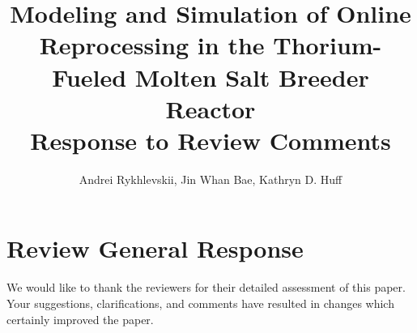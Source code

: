 \documentclass[answers,11pt]{exam}
\begin{document}


%

\title{Modeling and Simulation of Online Reprocessing in the Thorium-Fueled 
        Molten Salt Breeder Reactor\\
\large Response to Review Comments}
\author{Andrei Rykhlevskii, Jin Whan Bae, Kathryn D. Huff}



%
\maketitle
\section*{Review General Response}
We would like to thank the reviewers for their detailed assessment of
this paper. Your suggestions, clarifications, and comments have resulted in 
changes which certainly improved the paper.
\end{document}
